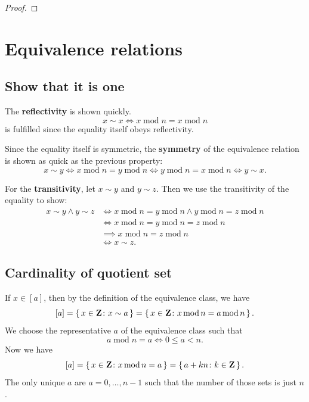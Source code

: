 \documentclass[11pt, english, fleqn, DIV=15, headinclude, BCOR=1cm]{scrartcl}
\begin{document}
\begin{proof}
    
\end{proof}

\section{Equivalence relations}

\subsection{Show that it is one}

\renewcommand\mod{\operatorname{mod}}

The \textbf{reflectivity} is shown quickly.
\[
    x \sim x \iff x \mod n = x \mod n
\]
is fulfilled since the equality itself obeys reflectivity.

Since the equality itself is symmetric, the \textbf{symmetry} of the
equivalence relation is shown as quick as the previous property:
\[
    x \sim y
    \iff
    x \mod n = y \mod n
    \iff
    y \mod n = x \mod n
    \iff
    y \sim x.
\]

For the \textbf{transitivity}, let $x \sim y$ and $y \sim z$. Then we use the
transitivity of the equality to show:
\begin{align*}
    x \sim y \land y \sim z
    &\iff
    x \mod n = y \mod n
    \land
    y \mod n = z \mod n \\
    &\iff
    x \mod n = y \mod n = z \mod n \\
    &\implies
    x \mod n = z \mod n \\
    &\iff
    x \sim z.
\end{align*}

\subsection{Cardinality of quotient set}

If $x \in [a]$, then by the definition of the equivalence class, we have
\[
    [a] = \set{x \in \Z \colon x \sim a}
    = \set{x \in \Z \colon x \mod n = a \mod n}.
\]
We choose the representative $a$ of the equivalence class such that
\[
    a \mod n = a
    \iff
    0 \leq a < n.
\]
Now we have
\[
    [a]
    = \set{x \in \Z \colon x \mod n = a}
    = \set{a + kn \colon k \in \Z}.
\]
The only unique $a$ are $a = 0, \ldots, n-1$ such that the number of those sets
is just $n$.
\end{document}
